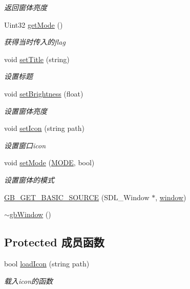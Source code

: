 \begin{DoxyCompactItemize}
\begin{DoxyCompactList}\small\item\em 返回窗体亮度 \end{DoxyCompactList}\item 
Uint32 \mbox{\hyperlink{classgb_window_af86a84effc2ab72df5dfa881c5e6d620}{get\+Mode}} ()
\begin{DoxyCompactList}\small\item\em 获得当时传入的flag \end{DoxyCompactList}\item 
void \mbox{\hyperlink{classgb_window_a17f154d7c86e29d7337fe46cc183c5dc}{set\+Title}} (string)
\begin{DoxyCompactList}\small\item\em 设置标题 \end{DoxyCompactList}\item 
void \mbox{\hyperlink{classgb_window_aec17f885a0d2dcf1a6d281799542071a}{set\+Brightness}} (float)
\begin{DoxyCompactList}\small\item\em 设置窗体亮度 \end{DoxyCompactList}\item 
void \mbox{\hyperlink{classgb_window_a1a4802fa6b726f60f6dd61c7de2f8d73}{set\+Icon}} (string path)
\begin{DoxyCompactList}\small\item\em 设置窗口icon \end{DoxyCompactList}\item 
void \mbox{\hyperlink{classgb_window_abf2068b28248fb4f9ed5d39a5df58d0a}{set\+Mode}} (\mbox{\hyperlink{classgb_window_a19e70d277e17598ddb3c229e28dbb9e9}{M\+O\+DE}}, bool)
\begin{DoxyCompactList}\small\item\em 设置窗体的模式 \end{DoxyCompactList}\item 
\mbox{\hyperlink{classgb_window_a7a24cdcd80201982dca8944b073a76f9}{G\+B\+\_\+\+G\+E\+T\+\_\+\+B\+A\+S\+I\+C\+\_\+\+S\+O\+U\+R\+CE}} (S\+D\+L\+\_\+\+Window $\ast$, \mbox{\hyperlink{classgb_window_a1faf26696f9974e05cae77fb240a502e}{window}})
\item 
\mbox{\hyperlink{classgb_window_acd0d49bdf1dbe7df86e02ba82a318571}{$\sim$gb\+Window}} ()
\end{DoxyCompactItemize}
\subsection*{Protected 成员函数}
\begin{DoxyCompactItemize}
\item 
bool \mbox{\hyperlink{classgb_window_a7afc7ded286b296fa5f2a324cbd065ff}{load\+Icon}} (string path)
\begin{DoxyCompactList}\small\item\em 载入icon的函数 \end{DoxyCompactList}\end{DoxyCompactItemize}
